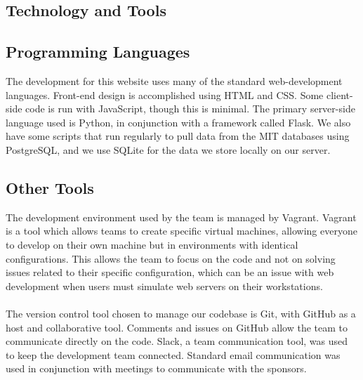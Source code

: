 \documentclass[12pt]{article}
\begin{document}
\begin{spacing}{1.5}
\section{Technology and Tools}
\subsection{Programming Languages}
The development for this website uses many of the standard web-development languages. Front-end design is accomplished using HTML and CSS. Some client-side code is run with JavaScript, though this is minimal. The primary server-side language used is Python, in conjunction with a framework called Flask. We also have some scripts that run regularly to pull data from the MIT databases using PostgreSQL, and we use SQLite for the data we store locally on our server.

\subsection{Other Tools}
The development environment used by the team is managed by Vagrant. Vagrant is a tool which allows teams to create specific virtual machines, allowing everyone to develop on their own machine but in environments with identical configurations. This allows the team to focus on the code and not on solving issues related to their specific configuration, which can be an issue with web development when users must simulate web servers on their workstations.
\\ \\
The version control tool chosen to manage our codebase is Git, with GitHub as a host and collaborative tool. Comments and issues on GitHub allow the team to communicate directly on the code. Slack, a team communication tool, was used to keep the development team connected. Standard email communication was used in conjunction with meetings to communicate with the sponsors.


\end{spacing}
\end{document}
